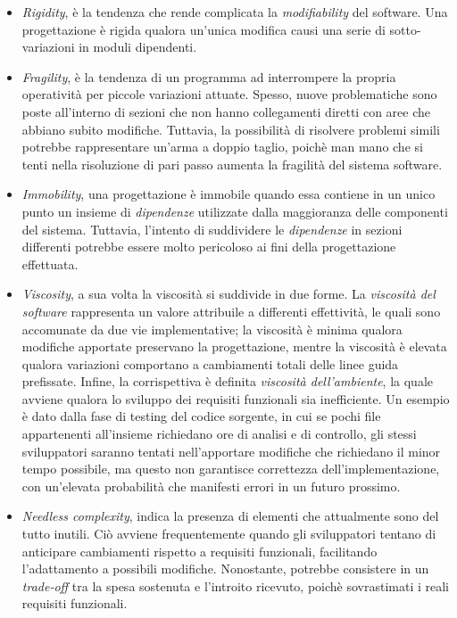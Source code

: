 \documentclass{article}
\begin{document}
\begin{itemize}[label={-}]
    \itemsep0em
    \item \textit{Rigidity}, è la tendenza che rende complicata la \textit{modifiability} del software. Una progettazione è rigida qualora un'unica modifica causi una serie di sotto-variazioni in moduli dipendenti.
    \item \textit{Fragility}, è la tendenza di un programma ad interrompere la propria operatività per piccole variazioni attuate. Spesso, nuove problematiche sono poste all'interno di sezioni che non hanno collegamenti diretti con aree che abbiano subito modifiche. Tuttavia, la possibilità di risolvere problemi simili potrebbe rappresentare un'arma a doppio taglio, poichè man mano che si tenti nella risoluzione di pari passo aumenta la fragilità del sistema software.
    \item \textit{Immobility}, una progettazione è immobile quando essa contiene in un unico punto un insieme di \textit{dipendenze} utilizzate dalla maggioranza delle componenti del sistema. Tuttavia, l'intento di suddividere le \textit{dipendenze} in sezioni differenti potrebbe essere molto pericoloso ai fini della progettazione effettuata.
    \item \textit{Viscosity}, a sua volta la viscosità si suddivide in due forme. La \textit{viscosità del software} rappresenta un valore attribuile a differenti effettività, le quali sono accomunate da due vie implementative; la viscosità è minima qualora modifiche apportate preservano la progettazione, mentre la viscosità è elevata qualora variazioni comportano a cambiamenti totali delle linee guida prefissate. Infine, la corrispettiva è definita \textit{viscosità dell'ambiente}, la quale avviene qualora lo sviluppo dei requisiti funzionali sia inefficiente. Un esempio è dato dalla fase di testing del codice sorgente, in cui se pochi file appartenenti all'insieme richiedano ore di analisi e di controllo, gli stessi sviluppatori saranno tentati nell'apportare modifiche che richiedano il minor tempo possibile, ma questo non garantisce correttezza dell'implementazione, con un'elevata probabilità che manifesti errori in un futuro prossimo.
    \item \textit{Needless complexity}, indica la presenza di elementi che attualmente sono del tutto inutili. Ciò avviene frequentemente quando gli sviluppatori tentano di anticipare cambiamenti rispetto a requisiti funzionali, facilitando l'adattamento a possibili modifiche. Nonostante, potrebbe consistere in un \textit{trade-off} tra la spesa sostenuta e l'introito ricevuto, poichè sovrastimati i reali requisiti funzionali.

\end{itemize}
\end{document}
